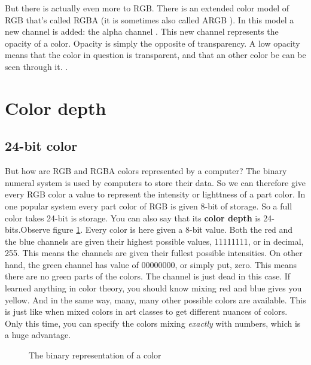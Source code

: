But there is actually even more to RGB. There is an extended color
model of RGB that's called RGBA (it is sometimes also
called ARGB ). In this model a new channel is added: the
alpha channel . This new channel represents the
opacity of a color. Opacity is simply the opposite of transparency.  A
low opacity means that the color in question is transparent,
 and that an other color be can be seen
through it.  \cite{porter84_compos_dig_img}.

\section{Color depth}
\label{sec:bit-depth}

\subsection{24-bit color}
\label{sec:24-bit-color}

But how are RGB and RGBA colors represented by a computer? The binary
numeral system is used by computers to store their data. So we can
therefore give every RGB color a value to represent the intensity or
lighttness of a part color. In one popular system every part color of
RGB is given 8-bit of storage. So a full color takes 24-bit is
storage. You can also say that its \textbf{color depth}
 is 24-bits.Observe figure \ref{fig:rgb-bits}. Every color is
here given a 8-bit value. Both the red and the blue channels are given
their highest possible values, 11111111, or in decimal, 255. This
means the channels are given their fullest possible intensities. On
other hand, the green channel has value of 00000000, or simply put,
zero. This means there are no green parts of the colors. The channel
is just dead in this case. If learned anything in color theory, you
should know mixing red and blue gives you yellow. And in the same way,
many, many other possible colors are available. This is just like when
mixed colors in art classes to get different nuances of colors. Only
this time, you can specify the colors mixing \emph{exactly} with
numbers, which is a huge advantage.
\cite{puglia00:_handbook_dig_proj}

\begin{figure}[h]
  \centering
  \newcommand{\bitbox}[3]{
    \filldraw[fill=#2!80!white,draw=black] (#1,0) +(-.2,-.2) rectangle ++(.2,.2);
    \draw (#1,0) node{#3};
  }
  \caption{The binary representation of a color}
  \label{fig:rgb-bits}
\end{figure}

